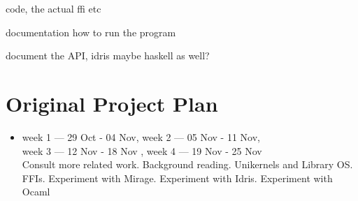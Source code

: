 
code, the actual ffi etc

documentation how to run the program

document the API, idris maybe haskell as well?

\section{Original Project Plan}\label{ch:origplan}
\begin{itemize}

    \item week 1 --- 29 Oct - 04 Nov,
          week 2 --- 05 Nov - 11 Nov, \\
          week 3 --- 12 Nov - 18 Nov ,
          week 4 --- 19 Nov - 25 Nov \\
          Consult more related work.
          Background reading.
          Unikernels and Library OS. \\
          FFIs.
          Experiment with Mirage.
          Experiment with Idris.
          Experiment with Ocaml


\end{itemize}

